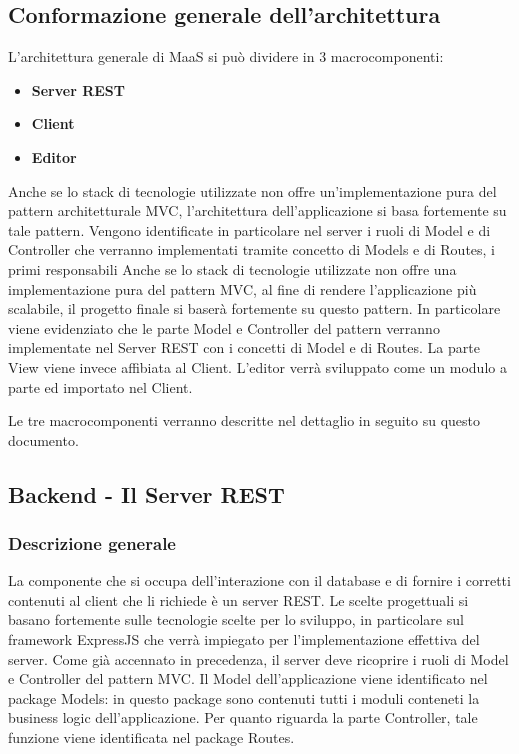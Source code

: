 \subsection{Conformazione generale dell'architettura}
L'architettura generale di MaaS si può dividere in 3 macrocomponenti:
\begin{itemize}
\item \textbf{Server REST} 
\item \textbf{Client} 
\item \textbf{Editor}
\end{itemize}
Anche se lo stack di tecnologie utilizzate non offre un'implementazione pura del pattern architetturale MVC, l'architettura dell'applicazione si basa fortemente su tale pattern. 
Vengono identificate in particolare nel server i ruoli di Model e di Controller che verranno implementati tramite concetto di Models e di Routes, i primi responsabili 
Anche se lo stack di tecnologie utilizzate non offre una implementazione pura del pattern MVC, al fine di rendere l'applicazione più scalabile, il progetto finale si baserà fortemente su questo pattern. In particolare viene evidenziato che le parte Model e Controller del pattern verranno implementate nel Server REST con i concetti di Model e di Routes. La parte View viene invece affibiata al Client. 
L'editor verrà sviluppato come un modulo a parte ed importato nel Client. %

Le tre macrocomponenti verranno descritte nel dettaglio in seguito su questo documento.

\subsection{Backend - Il Server REST}
\subsubsection{Descrizione generale}
La componente che si occupa dell'interazione con il database e di fornire i corretti contenuti al client che li richiede è un server REST.
Le scelte progettuali si basano fortemente sulle tecnologie scelte per lo sviluppo, in particolare sul framework ExpressJS che verrà impiegato per l'implementazione effettiva del server. Come già accennato in precedenza, il server deve ricoprire i ruoli di Model e Controller del pattern MVC.
Il Model dell'applicazione viene identificato nel package Models: in questo package sono contenuti tutti i moduli conteneti la business logic dell'applicazione.
Per quanto riguarda la parte Controller, tale funzione viene identificata nel package Routes.

